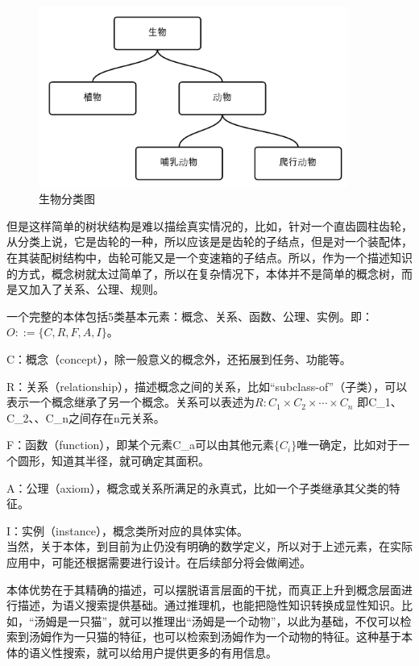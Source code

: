 \documentclass[12pt,a4paper]{article}
\begin{document}
	\begin{figure}[htbp] 
	\centering\includegraphics[width=4in]{fig/biotax.png} 
	\caption{生物分类图}\label{fig:生物分类} 
	\end{figure}	
	
	但是这样简单的树状结构是难以描绘真实情况的，比如，针对一个直齿圆柱齿轮，从分类上说，它是齿轮的一种，所以应该是是齿轮的子结点，但是对一个装配体，在其装配树结构中，齿轮可能又是一个变速箱的子结点。所以，作为一个描述知识的方式，概念树就太过简单了，所以在复杂情况下，本体并不是简单的概念树，而是又加入了关系、公理、规则。
	
	一个完整的本体包括5类基本元素：概念、关系、函数、公理、实例。即：$O::=\{C,R,F,A,I\}$。\cite{Chen2010}
	
	C：概念（concept），除一般意义的概念外，还拓展到任务、功能等。
	
	R：关系（relationship），描述概念之间的关系，比如“subclass-of”（子类），可以表示一个概念继承了另一个概念。关系可以表述为$ R:C_{1} \times C_{2} \times \cdots \times C_{n} $ 即C_{1}、C_{2}、\cdots 、C_{n}之间存在n元关系。
	
	F：函数（function），即某个元素C_{a}可以由其他元素$ \{C_{i}\} $唯一确定，比如对于一个圆形，知道其半径，就可确定其面积。
	
	A：公理（axiom），概念或关系所满足的永真式，比如一个子类继承其父类的特征。
	
	I：实例（instance），概念类所对应的具体实体。
	\\
	
	当然，关于本体，到目前为止仍没有明确的数学定义，所以对于上述元素，在实际应用中，可能还根据需要进行设计。在后续部分将会做阐述。
	
	本体优势在于其精确的描述，可以摆脱语言层面的干扰，而真正上升到概念层面进行描述，为语义搜索提供基础。通过推理机，也能把隐性知识转换成显性知识。比如，“汤姆是一只猫”，就可以推理出“汤姆是一个动物”，以此为基础，不仅可以检索到汤姆作为一只猫的特征，也可以检索到汤姆作为一个动物的特征。这种基于本体的语义性搜索，就可以给用户提供更多的有用信息。
\end{document}
